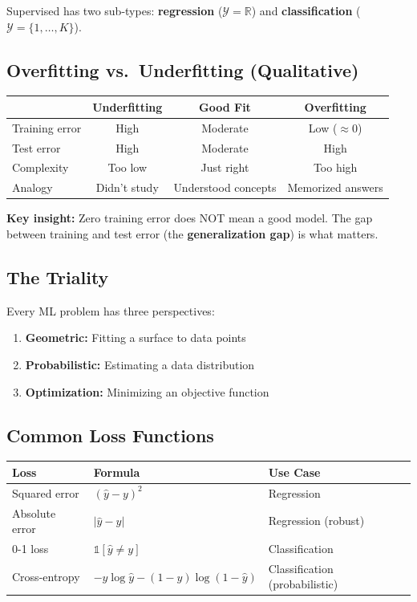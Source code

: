 \documentclass[11pt,a4paper]{article}
\begin{document}
Supervised has two sub-types: \textbf{regression} ($\mathcal{Y} = \mathbb{R}$) and \textbf{classification} ($\mathcal{Y} = \{1, \ldots, K\}$).

\subsection{Overfitting vs.\ Underfitting (Qualitative)}

\begin{center}
\begin{tabular}{|l|c|c|c|}
\hline
 & \textbf{Underfitting} & \textbf{Good Fit} & \textbf{Overfitting} \\
\hline
Training error & High & Moderate & Low ($\approx 0$) \\
Test error & High & Moderate & High \\
Complexity & Too low & Just right & Too high \\
Analogy & Didn't study & Understood concepts & Memorized answers \\
\hline
\end{tabular}
\end{center}

\textbf{Key insight:} Zero training error does NOT mean a good model. The gap between training and test error (the \textbf{generalization gap}) is what matters.

\subsection{The Triality}

Every ML problem has three perspectives:
\begin{enumerate}
    \item \textbf{Geometric:} Fitting a surface to data points
    \item \textbf{Probabilistic:} Estimating a data distribution
    \item \textbf{Optimization:} Minimizing an objective function
\end{enumerate}

\subsection{Common Loss Functions}

\begin{center}
\begin{tabular}{|l|l|l|}
\hline
\textbf{Loss} & \textbf{Formula} & \textbf{Use Case} \\
\hline
Squared error & $(\hat{y}-y)^2$ & Regression \\
Absolute error & $|\hat{y}-y|$ & Regression (robust) \\
0-1 loss & $\mathbb{1}[\hat{y} \neq y]$ & Classification \\
Cross-entropy & $-y\log\hat{y} - (1-y)\log(1-\hat{y})$ & Classification (probabilistic) \\
\hline
\end{tabular}
\end{center}
\end{document}
